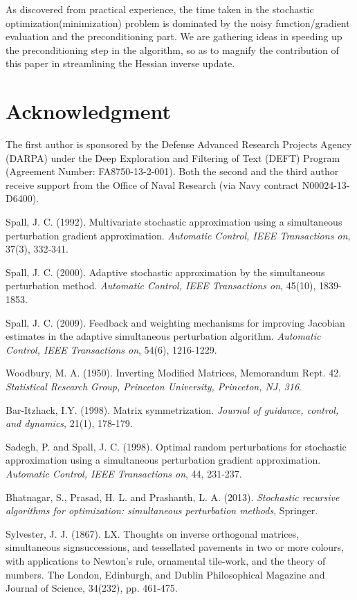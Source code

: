 \documentclass[conference]{IEEEtran}
\begin{document}
	As discovered from practical experience, the time taken in the stochastic optimization(minimization) problem is dominated by the noisy function/gradient evaluation and the preconditioning part. We are gathering ideas in speeding up the preconditioning step in the algorithm, so as to magnify the contribution of this paper in streamlining the Hessian inverse update.
		
	\section*{Acknowledgment}
	The first author is sponsored by the Defense Advanced
	Research Projects Agency (DARPA) under the Deep Exploration and
	Filtering of Text (DEFT) Program (Agreement Number: FA8750-13-2-001).
	Both the second and the third author receive support from the Office
	of Naval Research (via Navy contract N00024-13-D6400).
	
	\begin{thebibliography}{1}
		
		Spall, J. C. (1992). Multivariate stochastic approximation using a simultaneous perturbation gradient approximation. \textit{Automatic Control, IEEE Transactions on}, 37(3), 332-341.
		
		Spall, J. C. (2000). Adaptive stochastic approximation by the simultaneous perturbation method. \textit{Automatic Control, IEEE Transactions on}, 45(10), 1839-1853.
		
		Spall, J. C. (2009). Feedback and weighting mechanisms for improving Jacobian estimates in the adaptive simultaneous perturbation algorithm. \textit{Automatic Control, IEEE Transactions on}, 54(6), 1216-1229.
		
		Woodbury, M. A. (1950). Inverting Modified Matrices, Memorandum Rept. 42. \textit{Statistical Research Group, Princeton University, Princeton, NJ, 316}.
		
		Bar-Itzhack, I.Y. (1998). Matrix symmetrization. \textit{Journal of guidance, control, and dynamics}, 21(1), 178-179.
		
		
		Sadegh, P. and Spall, J. C. (1998). Optimal random perturbations for stochastic approximation using a simultaneous perturbation gradient approximation. \textit{Automatic Control, IEEE Transactions on}, 44, 231-237.
		
		Bhatnagar, S., Prasad, H. L. and Prashanth, L. A. (2013). \textit{Stochastic recursive algorithms for optimization: simultaneous perturbation methods}, Springer.
		
		Sylvester, J. J. (1867). LX. Thoughts on inverse orthogonal matrices, simultaneous signsuccessions, and tessellated pavements in two or more colours, with applications to Newton's rule, ornamental tile-work, and the theory of numbers. The London, Edinburgh, and Dublin Philosophical Magazine and Journal of Science, 34(232), pp. 461-475.
				
	\end{thebibliography}
\end{document}
